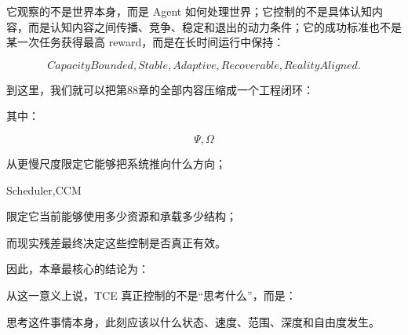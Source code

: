 它观察的不是世界本身，而是 Agent 如何处理世界；它控制的不是具体认知内容，而是认知内容之间传播、竞争、稳定和退出的动力条件；它的成功标准也不是某一次任务获得最高 reward，而是在长时间运行中保持：

\[
\boxed{
CapacityBounded,
Stable,
Adaptive,
Recoverable,
RealityAligned.
}
\]

到这里，我们就可以把第88章的全部内容压缩成一个工程闭环：

\begin{statementbox}
\centering
{}
\end{statementbox}

其中：

\[
\boxed{
\Psi,\Omega
}
\]

从更慢尺度限定它能够把系统推向什么方向；

\begin{statementbox}
Scheduler,CCM
\end{statementbox}

限定它当前能够使用多少资源和承载多少结构；

而现实残差最终决定这些控制是否真正有效。

因此，本章最核心的结论为：

\begin{statementbox}
\centering
{}
\end{statementbox}

从这一意义上说，TCE 真正控制的不是“思考什么”，而是：

\begin{statementbox}
思考这件事情本身，此刻应该以什么状态、速度、范围、深度和自由度发生。
\end{statementbox}
